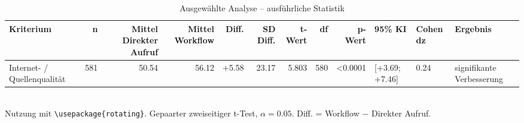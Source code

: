 \begin{table}
\centering
\caption{Ausgewählte Analyse -- ausführliche Statistik}
\begin{tabular}{lrrrrrrrrlll}
\toprule
Kriterium & n & Mittel Direkter Aufruf & Mittel Workflow & Diff. & SD Diff. & t-Wert & df & p-Wert & 95\% KI & Cohen dz & Ergebnis \\
\midrule
Internet- / Quellenqualität & 581 & 50.54 & 56.12 & +5.58 & 23.17 & 5.803 & 580 & <0.0001 & [+3.69; +7.46] & 0.24 & signifikante Verbesserung \\
\bottomrule
\end{tabular}
\\[2mm]
\footnotesize Nutzung mit \texttt{\textbackslash usepackage\{rotating\}}. Gepaarter zweiseitiger t-Test, $\alpha=0.05$. Diff. = Workflow $-$ Direkter Aufruf.
\end{table}
